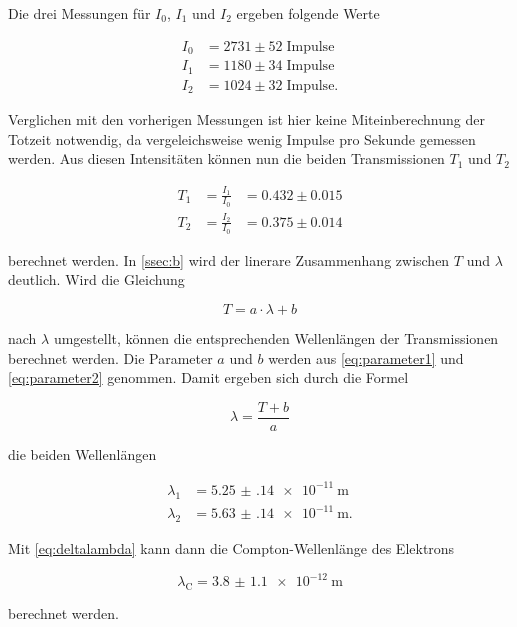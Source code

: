 Die drei Messungen für $I_0$, $I_1$ und $I_2$ ergeben folgende Werte

\begin{align*}
    I_0 &= 2731 \pm 52 \; \text{Impulse}\\
    I_1 &= 1180 \pm 34 \; \text{Impulse}\\
    I_2 &= 1024 \pm 32 \; \text{Impulse}.
\end{align*}

Verglichen mit den vorherigen Messungen ist hier keine Miteinberechnung der Totzeit notwendig, da vergeleichsweise wenig Impulse pro Sekunde gemessen werden.
Aus diesen Intensitäten können nun die beiden Transmissionen $T_1$ und $T_2$

\begin{align*}
    T_1 &= \frac{I_1}{I_0} &= 0.432 \pm 0.015\\
    T_2 &= \frac{I_2}{I_0} &= 0.375 \pm 0.014
\end{align*}

berechnet werden.
In \autoref{ssec:b} wird der linerare Zusammenhang zwischen $T$ und $\lambda$ deutlich.
Wird die Gleichung 

\begin{equation}
    T = a \cdot \lambda + b
\end{equation}

nach $\lambda$ umgestellt, können die entsprechenden Wellenlängen der Transmissionen berechnet werden.
Die Parameter $a$ und $b$ werden aus \eqref{eq:parameter1} und \eqref{eq:parameter2} genommen.
Damit ergeben sich durch die Formel 

\begin{equation}
    \lambda = \frac{T + b}{a}
\end{equation}

die beiden Wellenlängen

\begin{align*}
    \lambda _1 &= \SI{5.25(14)e-11}{\meter}\\
    \lambda _2 &= \SI{5.63(14)e-11}{\meter}.
\end{align*}

Mit \eqref{eq:deltalambda} kann dann die Compton-Wellenlänge des Elektrons

\begin{equation}
    \lambda _\text{C} = \SI{3.8(11)e-12}{\meter}
\end{equation}

berechnet werden.